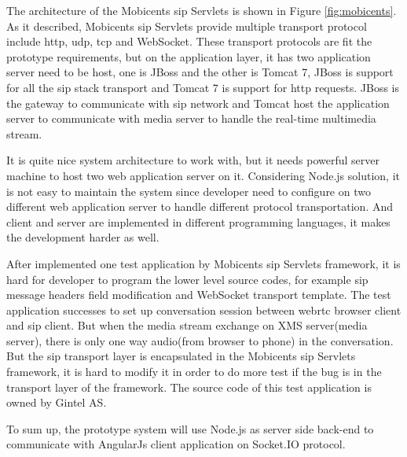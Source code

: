 \par The architecture of the Mobicents \gls{sip} Servlets is shown in Figure \ref{fig:mobicents}. As it described, Mobicents \gls{sip} Servlets provide multiple transport protocol include \gls{http}, \gls{udp}, \gls{tcp} and WebSocket. These transport protocols are fit the prototype requirements, but on the application layer, it has two application server need to be host, one is JBoss and the other is Tomcat 7, JBoss is support for all the \gls{sip} stack transport and Tomcat 7 is support for \gls{http} requests. JBoss is the gateway to communicate with \gls{sip} network and Tomcat host the application server to communicate with media server to handle the real-time multimedia stream.

\par It is quite nice system architecture to work with, but it needs powerful server machine to host two web application server on it. Considering Node.js solution, it is not easy to maintain the system since developer need to configure on two different web application server to handle different protocol transportation. And client and server are implemented in different programming languages, it makes the development harder as well.

\par After implemented one test application by Mobicents \gls{sip} Servlets framework, it is hard for developer to program the lower level source codes, for example \gls{sip} message headers field modification and WebSocket transport template. The test application successes to set up conversation session between \gls{webrtc} browser client and \gls{sip} client. But when the media stream exchange on XMS server(media server), there is only one way audio(from browser to phone) in the conversation. But the \gls{sip} transport layer is encapsulated in the Mobicents \gls{sip} Servlets framework, it is hard to modify it in order to do more test if the bug is in the transport layer of the framework. The source code of this test application is owned by Gintel AS.

\par To sum up, the prototype system will use Node.js as server side back-end to communicate with AngularJs client application on Socket.IO protocol.